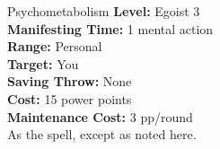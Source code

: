 {Psychometabolism}
{
	\textbf{Level:}
	Egoist 3\\
	\textbf{Manifesting Time:}
	1 mental action\\
	\textbf{Range:}
	Personal\\
	\textbf{Target:}
	You\\
	\textbf{Saving Throw:}
	None\\
	\textbf{Cost:}
	15 power points\\
	\textbf{Maintenance Cost:}
	3 pp/round\\
}
{
	As the  spell, except as noted here.
}